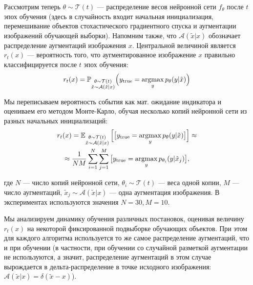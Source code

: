 Рассмотрим теперь $\theta \sim \mathcal{T}(t)$ --- распределение весов нейронной сети $f_{\theta}$ после $t$ эпох обучения (здесь в случайность входит начальная инициализация, перемешивание объектов стохастического градиентного спуска и аугментации изображений обучающей выборки). Напомним также, что $\mathcal{A}(\tilde{x}|x)$ обозначает распределение аугментаций изображения $x$. Центральной величиной является $r_t(x)$ --- вероятность того, что аугментированное изображение $x$ правильно классифицируется после $t$ эпох обучения:
\begin{equation}
    r_t(x) = \mathbb{P}_{\substack{\theta \sim \mathcal{T}(t) \\ \tilde{x} \sim \mathcal{A}(\tilde{x}|x)}} \Big(y_{\text{true}} = \operatorname*{argmax}_{y} p_{\theta}(y|\tilde{x})\Big)
\end{equation}

Мы переписываем вероятность события как мат. ожидание индикатора и оцениваем его методом Монте-Карло, обучая несколько копий нейронной сети из разных начальных инициализаций:
\begin{equation}
\label{experiments:eq:1}
\begin{gathered}
    r_t(x) = \operatorname{\mathbb{E}}_{\substack{\theta \sim \mathcal{T}(t) \\ \tilde{x} \sim \mathcal{A}(\tilde{x}|x)}} \Big[\big[y_{\text{true}} = \operatorname*{argmax}_{y} p_{\theta}(y|\tilde{x})\big]\Big] \approx \\
    \approx \frac{1}{NM} \sum_{i=1}^N\sum_{j=1}^M \big[y_{\text{true}} = \operatorname*{argmax}_{y} p_{\theta_i}(y|\tilde{x}_j)\big],
\end{gathered}
\end{equation}

\noindent
где $N$ --- число копий нейронной сети, $\theta_i \sim \mathcal{T}(t)$ --- веса одной копии, \linebreak $M$ --- число аугментаций, $\tilde{x}_j \sim \mathcal{A}(\tilde{x}|x)$ --- одна аугментация изображения. В экспериментах используются значения $N=30, M=10$.

Мы анализируем динамику обучения различных постановок, оценивая величину $r_t(x)$ на некоторой фиксированной подвыборке обучающих объектов. При этом для каждого алгоритма используется то же самое распределение аугментаций, что и при обучении (в частности, при обучении со случайной разметкой аугментации не используются, а значит, распределение аугментаций в этом случае вырождается в дельта-распределение в точке исходного изображения: $\mathcal{A}(\tilde{x}|x) = \delta(\tilde{x} - x)$).

